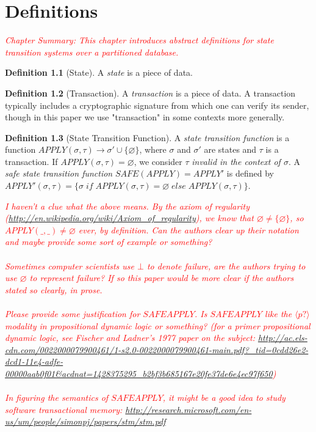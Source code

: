 \documentclass[11pt,a4paper]{report}
\newcommand{\comment}[1]{\textcolor{red}{\textit{#1}}}
\theoremstyle{plain}
\theoremstyle{definition}
\newtheorem{defn}{Definition}[chapter]
\theoremstyle{remark}
\begin{document}
\chapter{Definitions}

\comment{Chapter Summary:  This chapter introduces abstract definitions for state transition systems over a partitioned database.}

\begin{defn}[State]
A \emph{state} is a piece of data.
\end{defn}

\begin{defn}[Transaction]
A \emph{transaction} is a piece of data. A transaction typically includes a cryptographic signature from which one can verify its sender, though in this paper we use "transaction" in some contexts more generally.
\end{defn}

\begin{defn}[State Transition Function]
A \emph{state transition function} is a function $APPLY(\sigma, \tau) \rightarrow \sigma' \cup \{\varnothing\}$, where $\sigma$ and $\sigma'$ are states and $\tau$ is a transaction. If $APPLY(\sigma, \tau) = \varnothing$, we consider $\tau$ \emph{invalid in the context of $\sigma$}. A \emph{safe state transition function} $SAFE(APPLY) = APPLY'$ is defined by $APPLY'(\sigma, \tau) = \{\sigma \; if \; APPLY(\sigma, \tau) = \varnothing \; else \; APPLY(\sigma, \tau)\}$.
\end{defn}

\comment{I haven't a clue what the above means.  By the axiom of regularity (\url{http://en.wikipedia.org/wiki/Axiom_of_regularity}), we know that $\varnothing \neq \{\varnothing\}$, so $APPLY(\_,\_) \neq \varnothing$ ever, by definition.  Can the authors clear up their notation and maybe provide some sort of example or something?\\
\\
Sometimes computer scientists use $\bot$ to denote failure, are the authors trying to use $\varnothing$ to represent failure?  If so this paper would be more clear if the authors stated so clearly, in prose. \\
\\
  Please provide some justification for $SAFEAPPLY$.  Is $SAFEAPPLY$ like the $\langle p ? \rangle$ modality in propositional dynamic logic or something? (for a primer propositional dynamic logic, see Fischer and Ladner's 1977 paper on the subject: \url{http://ac.els-cdn.com/0022000079900461/1-s2.0-0022000079900461-main.pdf?_tid=0cdd26e2-dcd1-11e4-adfe-00000aab0f01&acdnat=1428375295_b2bf3b685167e20fe37de6e4ec97f650})\\
  \\
  In figuring the semantics of $SAFEAPPLY$, it might be a good idea to study software transactional memory: \url{http://research.microsoft.com/en-us/um/people/simonpj/papers/stm/stm.pdf}}
\end{document}
